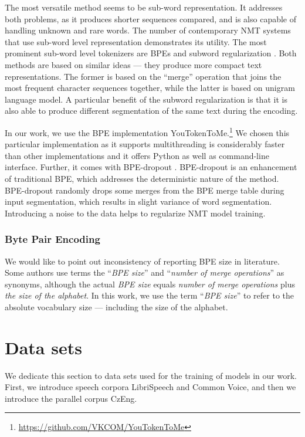 The most versatile method seems to be sub-word representation. It addresses both problems, as it produces shorter sequences compared, and is also capable of handling unknown and rare words. The number of contemporary NMT systems that use sub-word level representation demonstrates its utility. The most prominent sub-word level tokenizers are BPEs  and subword regularization . Both methods are based on similar ideas --- they produce more compact text representations. The former is based on the ``merge'' operation that joins the most frequent character sequences together, while the latter is based on unigram language model. A particular benefit of the subword regularization is that it is also able to produce different segmentation of the same text during the encoding.

In our work, we use the BPE implementation YouTokenToMe.\footnote{\url{https://github.com/VKCOM/YouTokenToMe}} We chosen this particular implementation as it supports multithreading is considerably faster than other implementations and it offers Python as well as command-line interface. Further, it comes with BPE-dropout . BPE-dropout is an enhancement of traditional BPE, which addresses the deterministic nature of the method. BPE-dropout randomly drops some merges from the BPE merge table during input segmentation, which results in slight variance of word segmentation. Introducing a noise to the data helps to regularize NMT model training.

\subsubsection{Byte Pair Encoding}
We would like to point out inconsistency of reporting BPE size in literature. Some authors use terms the ``\textit{BPE size}'' and ``\textit{number of merge operations}'' as synonyms, although the actual \textit{BPE size} equals \textit{number of merge operations} plus \textit{the size of the alphabet}. In this work, we use the term ``\textit{BPE size}'' to refer to the absolute vocabulary size --- including the size of the alphabet. 

\pagebreak
\section{Data sets}
We dedicate this section to data sets used for the training of models in our work. First, we introduce speech corpora LibriSpeech and Common Voice, and then we introduce the parallel corpus CzEng.


